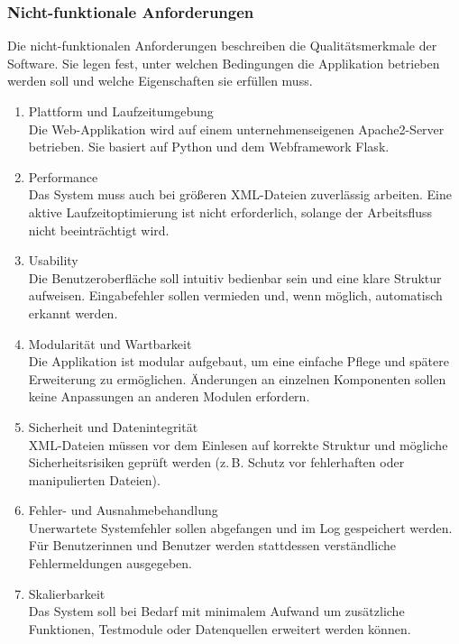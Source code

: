 \subsubsection{Nicht-funktionale Anforderungen}
\label{subsec:nicht-funktionale-anforderungen}

Die nicht-funktionalen Anforderungen beschreiben die Qualitätsmerkmale der Software.
Sie legen fest, unter welchen Bedingungen die Applikation betrieben werden soll und welche Eigenschaften sie erfüllen muss.

\begin{enumerate}
  \item Plattform und Laufzeitumgebung \\
  Die Web-Applikation wird auf einem unternehmenseigenen Apache2-Server betrieben.
  Sie basiert auf Python und dem Webframework Flask.

  \item Performance \\
  Das System muss auch bei größeren XML-Dateien zuverlässig arbeiten.
  Eine aktive Laufzeitoptimierung ist nicht erforderlich, solange der Arbeitsfluss nicht beeinträchtigt wird.

  \item Usability \\
  Die Benutzeroberfläche soll intuitiv bedienbar sein und eine klare Struktur aufweisen.
  Eingabefehler sollen vermieden und, wenn möglich, automatisch erkannt werden.

  \item Modularität und Wartbarkeit \\
  Die Applikation ist modular aufgebaut, um eine einfache Pflege und spätere Erweiterung zu ermöglichen.
  Änderungen an einzelnen Komponenten sollen keine Anpassungen an anderen Modulen erfordern.

  \item Sicherheit und Datenintegrität \\
  XML-Dateien müssen vor dem Einlesen auf korrekte Struktur und mögliche Sicherheitsrisiken geprüft werden
  (z.\,B. Schutz vor fehlerhaften oder manipulierten Dateien).

  \item Fehler- und Ausnahmebehandlung \\
  Unerwartete Systemfehler sollen abgefangen und im Log gespeichert werden.
  Für Benutzerinnen und Benutzer werden stattdessen verständliche Fehlermeldungen ausgegeben.

  \item Skalierbarkeit \\
  Das System soll bei Bedarf mit minimalem Aufwand um zusätzliche Funktionen, Testmodule oder Datenquellen erweitert werden können.


\end{enumerate}
